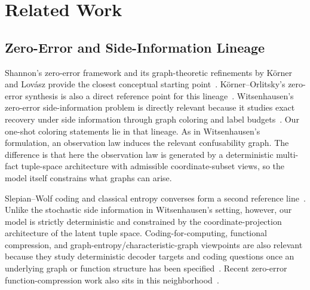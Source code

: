 \section{Related Work}\label{sec:related}

\subsection{Zero-Error and Side-Information Lineage}\label{sec:related-source-coding}

Shannon's zero-error framework and its graph-theoretic refinements by Körner and Lovász provide the closest conceptual starting point~\cite{shannon1956zero,korner1973graphs,lovasz1979shannon}. Körner--Orlitsky's zero-error synthesis is also a direct reference point for this lineage~\cite{korner2002zero}. Witsenhausen's zero-error side-information problem is directly relevant because it studies exact recovery under side information through graph coloring and label budgets~\cite{witsenhausen1976zero}. Our one-shot coloring statements lie in that lineage. As in Witsenhausen's formulation, an observation law induces the relevant confusability graph. The difference is that here the observation law is generated by a deterministic multi-fact tuple-space architecture with admissible coordinate-subset views, so the model itself constrains what graphs can arise.

Slepian--Wolf coding and classical entropy converses form a second reference line~\cite{slepian1973noiseless,fano1961transmission,witsenhausen1975conditional,cover2006elements}. Unlike the stochastic side information in Witsenhausen's setting, however, our model is strictly deterministic and constrained by the coordinate-projection architecture of the latent tuple space. Coding-for-computing, functional compression, and graph-entropy/characteristic-graph viewpoints are also relevant because they study deterministic decoder targets and coding questions once an underlying graph or function structure has been specified~\cite{orlitsky2001coding,alon2002source,doshi2010functional,korner1973graphs,simonyi2001graph}. Recent zero-error function-compression work also sits in this neighborhood~\cite{guang2023zero,liu2021leakage}.


